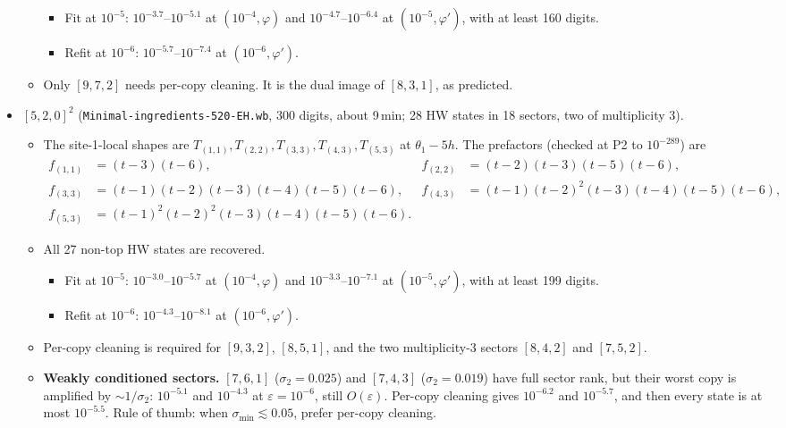 \documentclass[11pt]{article}
\newcommand{\eps}{\varepsilon}
\begin{document}
\begin{itemize}
\begin{itemize}
    \begin{itemize}
    \item Fit at $10^{-5}$: $10^{-3.7}$--$10^{-5.1}$ at $(10^{-4},\varphi)$ and $10^{-4.7}$--$10^{-6.4}$ at $(10^{-5},\varphi')$, with at least 160 digits.
    \item Refit at $10^{-6}$: $10^{-5.7}$--$10^{-7.4}$ at $(10^{-6},\varphi')$.
    \end{itemize}
  \item Only $[9,7,2]$ needs per-copy cleaning. It is the dual image of $[8,3,1]$, as predicted.
  \end{itemize}
\item \textbf{$[5,2,0]^2$} (\texttt{Minimal-ingredients-520-EH.wb}, 300 digits, about 9\,min; 28 HW states in 18 sectors, two of multiplicity 3).
  \begin{itemize}
  \item The site-1-local shapes are $T_{(1,1)},T_{(2,2)},T_{(3,3)},T_{(4,3)},T_{(5,3)}$ at $\theta_1-5h$. The prefactors (checked at P2 to $10^{-289}$) are
  \begin{align*}
  f_{(1,1)}&=(t-3)(t-6), & f_{(2,2)}&=(t-2)(t-3)(t-5)(t-6),\\
  f_{(3,3)}&=(t-1)(t-2)(t-3)(t-4)(t-5)(t-6), & f_{(4,3)}&=(t-1)(t-2)^2(t-3)(t-4)(t-5)(t-6),\\
  f_{(5,3)}&=(t-1)^2(t-2)^2(t-3)(t-4)(t-5)(t-6).
  \end{align*}
  \item All 27 non-top HW states are recovered.
    \begin{itemize}
    \item Fit at $10^{-5}$: $10^{-3.0}$--$10^{-5.7}$ at $(10^{-4},\varphi)$ and $10^{-3.3}$--$10^{-7.1}$ at $(10^{-5},\varphi')$, with at least 199 digits.
    \item Refit at $10^{-6}$: $10^{-4.3}$--$10^{-8.1}$ at $(10^{-6},\varphi')$.
    \end{itemize}
  \item Per-copy cleaning is required for $[9,3,2]$, $[8,5,1]$, and the two multiplicity-3 sectors $[8,4,2]$ and $[7,5,2]$.
  \item \textbf{Weakly conditioned sectors.} $[7,6,1]$ ($\sigma_2=0.025$) and $[7,4,3]$ ($\sigma_2=0.019$) have full sector rank, but their worst copy is amplified by $\sim1/\sigma_2$: $10^{-5.1}$ and $10^{-4.3}$ at $\eps=10^{-6}$, still $O(\eps)$. Per-copy cleaning gives $10^{-6.2}$ and $10^{-5.7}$, and then every state is at most $10^{-5.5}$. Rule of thumb: when $\sigma_{\min}\lesssim0.05$, prefer per-copy cleaning.

\end{itemize}
\end{itemize}
\end{document}

